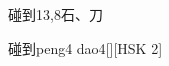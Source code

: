 \begin{entry}{碰到}{13,8}{⽯、⼑}
  \begin{phonetics}{碰到}{peng4 dao4}[][HSK 2]
  \end{phonetics}
\end{entry}
